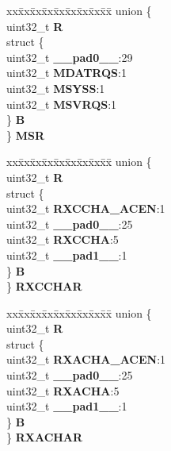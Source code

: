 \begin{DoxyCompactItemize}
\begin{tabbing}
\end{tabbing}\item 
\mbox{\label{structMLB__tag_a6df8485dfab044f131ac6d717bbd1222}} 
\begin{tabbing}
xx\=xx\=xx\=xx\=xx\=xx\=xx\=xx\=xx\=\kill
union \{\\
\>uint32\_t {\bfseries R}\\
\>struct \{\\
\>\>uint32\_t {\bfseries \_\_pad0\_\_}:29\\
\>\>uint32\_t {\bfseries MDATRQS}:1\\
\>\>uint32\_t {\bfseries MSYSS}:1\\
\>\>uint32\_t {\bfseries MSVRQS}:1\\
\>\} {\bfseries B}\\
\} {\bfseries MSR}\\

\end{tabbing}\item 
\mbox{\label{structMLB__tag_aaf17cb9f633725d62b9602efe815852f}} 
\begin{tabbing}
xx\=xx\=xx\=xx\=xx\=xx\=xx\=xx\=xx\=\kill
union \{\\
\>uint32\_t {\bfseries R}\\
\>struct \{\\
\>\>uint32\_t {\bfseries RXCCHA\_ACEN}:1\\
\>\>uint32\_t {\bfseries \_\_pad0\_\_}:25\\
\>\>uint32\_t {\bfseries RXCCHA}:5\\
\>\>uint32\_t {\bfseries \_\_pad1\_\_}:1\\
\>\} {\bfseries B}\\
\} {\bfseries RXCCHAR}\\

\end{tabbing}\item 
\mbox{\label{structMLB__tag_a644ad67c2c927588a95195cc3496eedf}} 
\begin{tabbing}
xx\=xx\=xx\=xx\=xx\=xx\=xx\=xx\=xx\=\kill
union \{\\
\>uint32\_t {\bfseries R}\\
\>struct \{\\
\>\>uint32\_t {\bfseries RXACHA\_ACEN}:1\\
\>\>uint32\_t {\bfseries \_\_pad0\_\_}:25\\
\>\>uint32\_t {\bfseries RXACHA}:5\\
\>\>uint32\_t {\bfseries \_\_pad1\_\_}:1\\
\>\} {\bfseries B}\\
\} {\bfseries RXACHAR}\\


\end{tabbing}
\end{DoxyCompactItemize}
